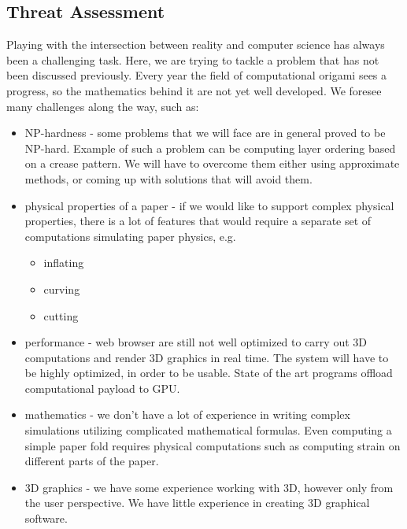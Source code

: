 \subsection{Threat Assessment}

Playing with the intersection between reality and computer science has always
been a challenging task.
Here, we are trying to tackle a problem that has not been discussed previously.
Every year the field of computational origami sees a progress,
so the mathematics behind it are not yet well developed.
We foresee many challenges along the way, such as:

\begin{itemize}
	\item NP-hardness - some problems that we will face are in general proved to be NP-hard.
		Example of such a problem can be computing layer ordering based on a crease pattern.
		We will have to overcome them either using approximate methods, or coming up with solutions that will avoid them.

	\item physical properties of a paper - if we would like to support complex physical properties,
		there is a lot of features that would require a separate set of computations simulating paper physics, e.g.
		\begin{itemize}
			\item inflating
			\item curving 
			\item cutting
		\end{itemize}

	\item performance - web browser are still not well optimized to carry out 3D computations and render 3D graphics in real time.
		The system will have to be highly optimized, in order to be usable.
		State of the art programs offload computational payload to GPU.

	\item mathematics - we don't have a lot of experience in writing complex simulations utilizing complicated mathematical formulas.
		Even computing a simple paper fold requires physical computations such as computing strain on different parts of the paper.

	\item 3D graphics - we have some experience working with 3D, however only from the user perspective.
		We have little experience in creating 3D graphical software.

\end{itemize}

